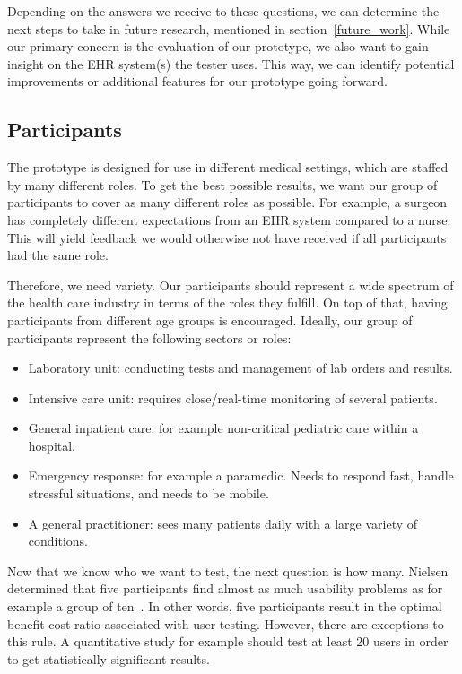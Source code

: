     \noindent Depending on the answers we receive to these questions, we can determine the next steps to take in future research, mentioned in section~\ref{future_work}. While our primary concern is the evaluation of our prototype, we also want to gain insight on the EHR system(s) the tester uses. This way, we can identify potential improvements or additional features for our prototype going forward. %

    \subsection{Participants}\label{test_participants}

    The prototype is designed for use in different medical settings, which are staffed by many different roles. To get the best possible results, we want our group of participants to cover as many different roles as possible. For example, a surgeon has completely different expectations from an EHR system compared to a nurse. This will yield feedback we would otherwise not have received if all participants had the same role.

    Therefore, we need variety. Our participants should represent a wide spectrum of the health care industry in terms of the roles they fulfill. On top of that, having participants from different age groups is encouraged. Ideally, our group of participants represent the following sectors or roles:
    \begin{itemize}
        \item Laboratory unit: conducting tests and management of lab orders and results.
        \item Intensive care unit: requires close/real-time monitoring of several patients.
        \item General inpatient care: for example non-critical pediatric care within a hospital.
        \item Emergency response: for example a paramedic. Needs to respond fast, handle stressful situations, and needs to be mobile.
        \item A general practitioner: sees many patients daily with a large variety of conditions.
    \end{itemize}

    \noindent Now that we know who we want to test, the next question is how many. Nielsen determined that five participants find almost as much usability problems as for example a group of ten~\cite{Nielsen2012}. In other words, five participants result in the optimal benefit-cost ratio associated with user testing. However, there are exceptions to this rule. A quantitative study for example should test at least 20 users in order to get statistically significant results.

